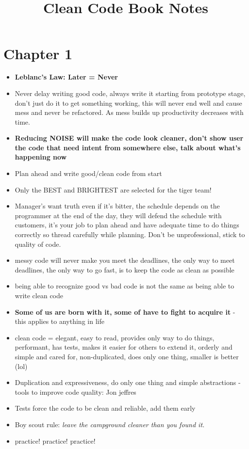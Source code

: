 \documentclass[14pt]{article}
\begin{document}
\title{Clean Code Book Notes}
\maketitle

\section*{Chapter 1}
\begin{itemize}

	\item \textbf{Leblanc's Law: Later = Never}
	\item Never delay writing good code, always write it starting from prototype stage, don't just do it to get something working, this will never end well and cause mess and never be refactored. As mess builds up  productivity decreases with time.
	\item \textbf{Reducing NOISE will make the code look cleaner, don't show user the code that need intent from somewhere else, talk about what's happening now}
	\item Plan ahead and write good/clean code from start
	\item Only the BEST and BRIGHTEST are selected for the tiger team! 
	\item Manager's want truth even if it's bitter, the schedule depends on the programmer at the end of the day, they will defend the schedule with customers, it's your job to plan ahead and have adequate time to do things correctly so thread carefully while planning. Don't be unprofessional, stick to quality of code.
	\item messy code will never make you meet the deadlines, the only way to meet deadlines, the only way to go fast, is to keep the code as clean as possible
	\item being able to recognize good vs bad code is not the same as being able to write clean code
	\item \textbf{Some of us are born with it, some of have to fight to acquire it} - this applies to anything in life
	\item clean code = elegant, easy to read, provides only way to do things, performant, has tests, makes it easier for others to extend it, orderly and simple and cared for, non-duplicated, does only one thing, smaller is better (lol)
	\item Duplication and expressiveness, do only one thing and simple abstractions - tools to improve code quality: Jon jeffres
	\item Tests force the code to be clean and reliable, add them early
	\item Boy scout rule: \textit{leave the campground cleaner than you found it.}
	\item practice! practice! practice!
\end{itemize}
\end{document}

